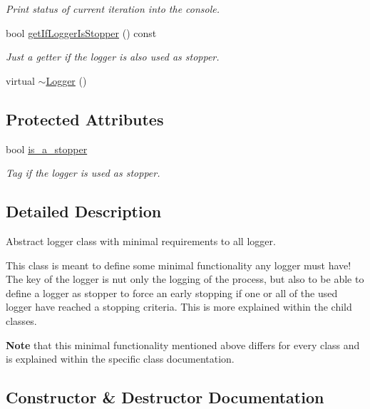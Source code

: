 \begin{DoxyCompactItemize}
\begin{DoxyCompactList}\small\item\em Print status of current iteration into the console. \end{DoxyCompactList}\item 
bool \mbox{\hyperlink{classlogger_1_1_logger_ae39cfa15ba833840ae52889c09cac994}{get\+If\+Logger\+Is\+Stopper}} () const
\begin{DoxyCompactList}\small\item\em Just a getter if the logger is also used as stopper. \end{DoxyCompactList}\item 
virtual \mbox{\hyperlink{classlogger_1_1_logger_aa85a309d218f9f006600cbaf2a348f52}{$\sim$\+Logger}} ()
\end{DoxyCompactItemize}
\subsection*{Protected Attributes}
\begin{DoxyCompactItemize}
\item 
bool \mbox{\hyperlink{classlogger_1_1_logger_a57ca2ab531e0a7ac74f4ecd4b74a938f}{is\+\_\+a\+\_\+stopper}}
\begin{DoxyCompactList}\small\item\em Tag if the logger is used as stopper. \end{DoxyCompactList}\end{DoxyCompactItemize}


\subsection{Detailed Description}
Abstract logger class with minimal requirements to all logger. 

This class is meant to define some minimal functionality any logger must have! The key of the logger is nut only the logging of the process, but also to be able to define a logger as stopper to force an early stopping if one or all of the used logger have reached a stopping criteria. This is more explained within the child classes.

{\bfseries Note} that this minimal functionality mentioned above differs for every class and is explained within the specific class documentation. 

\subsection{Constructor \& Destructor Documentation}
\mbox{\label{classlogger_1_1_logger_aa85a309d218f9f006600cbaf2a348f52}} 
